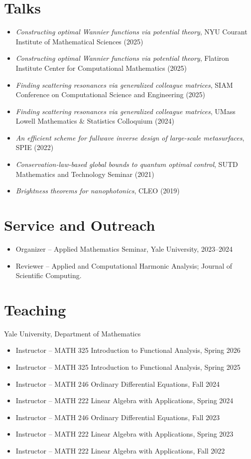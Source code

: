 \documentclass[margin,line,pifont,palatino,courier]{res}
\begin{document}
\begin{resume}
\section{\sc Talks}
\begin{itemize}
		\item \emph{Constructing optimal Wannier functions via potential theory}, NYU Courant Institute of Mathematical Sciences (2025)
		\item \emph{Constructing optimal Wannier functions via potential theory}, Flatiron Institute  Center for Computational Mathematics (2025)
	\item \emph{Finding scattering resonances via generalized colleague matrices}, SIAM Conference on Computational Science and Engineering (2025)
	\item \emph{Finding scattering resonances via generalized colleague matrices}, UMass Lowell Mathematics \& Statistics Colloquium (2024)
	\item \emph{An efficient scheme for fullwave inverse design of large-scale metasurfaces}, SPIE (2022)
	\item \emph{Conservation-law-based global bounds to quantum optimal control}, SUTD Mathematics and Technology Seminar (2021)
	\item \emph{Brightness theorems for nanophotonics}, CLEO (2019)
\end{itemize}


\section{\sc Service and Outreach}
\begin{itemize}
	\setlength\itemsep{0em}
	\item	Organizer -- Applied Mathematics Seminar, Yale University, 2023--2024\\
	\item Reviewer -- Applied and Computational Harmonic Analysis; Journal of Scientific Computing.
\end{itemize}


\section{\sc Teaching}
Yale University, Department of Mathematics

\begin{itemize}
\setlength\itemsep{0em}
	\item Instructor -- MATH 325 Introduction to Functional Analysis, Spring 2026
	\item Instructor -- MATH 325 Introduction to Functional Analysis, Spring 2025
	\item Instructor -- MATH 246 Ordinary Differential Equations, Fall 2024
		\item Instructor -- MATH 222 Linear Algebra with Applications, Spring 2024
	\item Instructor -- MATH 246 Ordinary Differential Equations, Fall 2023
	\item Instructor -- MATH 222 Linear Algebra with Applications, Spring 2023
	\item Instructor -- MATH 222 Linear Algebra with Applications, Fall 2022


\end{itemize}
\end{resume}
\end{document}
